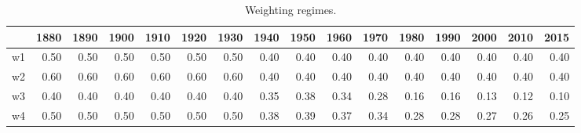 \documentclass[11pt]{article}\usepackage[]{graphicx}\usepackage[]{color}
\begin{document}
\begin{table}[ht]
\centering
\begingroup\footnotesize
\begin{tabular}{rrrrrrrrrrrrrrrr}
  \hline
 & 1880 & 1890 & 1900 & 1910 & 1920 & 1930 & 1940 & 1950 & 1960 & 1970 & 1980 & 1990 & 2000 & 2010 & 2015 \\ 
  \hline
w1 & 0.50 & 0.50 & 0.50 & 0.50 & 0.50 & 0.50 & 0.40 & 0.40 & 0.40 & 0.40 & 0.40 & 0.40 & 0.40 & 0.40 & 0.40 \\ 
  w2 & 0.60 & 0.60 & 0.60 & 0.60 & 0.60 & 0.60 & 0.40 & 0.40 & 0.40 & 0.40 & 0.40 & 0.40 & 0.40 & 0.40 & 0.40 \\ 
  w3 & 0.40 & 0.40 & 0.40 & 0.40 & 0.40 & 0.40 & 0.35 & 0.38 & 0.34 & 0.28 & 0.16 & 0.16 & 0.13 & 0.12 & 0.10 \\ 
  w4 & 0.50 & 0.50 & 0.50 & 0.50 & 0.50 & 0.50 & 0.38 & 0.39 & 0.37 & 0.34 & 0.28 & 0.28 & 0.27 & 0.26 & 0.25 \\ 
   \hline
\end{tabular}
\endgroup
\caption{Weighting regimes.} 
\end{table}
\end{document}
